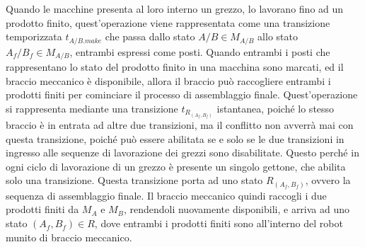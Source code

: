 \documentclass{article}
\numberwithin{equation}{subsection}
\begin{document}
Quando le macchine presenta al loro interno un grezzo, lo lavorano fino ad un prodotto finito, quest'operazione viene rappresentata come una transizione 
temporizzata $t_{A/B.make}$ che passa dallo stato $A/B\in M_{A/B}$ allo stato $A_f/B_f\in M_{A/B}$, entrambi espressi come posti. Quando entrambi i posti che rappresentano 
lo stato del prodotto finito in una macchina sono marcati, ed il braccio meccanico è disponibile, allora il braccio può raccogliere entrambi i prodotti finiti per cominciare 
il processo di assemblaggio finale. Quest'operazione si rappresenta mediante una transizione $t_{R_{(A_f,B_f)}}$ istantanea, poiché lo stesso braccio è in entrata ad altre due 
transizioni, ma il conflitto non avverrà mai con questa transizione, poiché può essere abilitata se e solo se le due transizioni in ingresso alle sequenze di lavorazione dei 
grezzi sono disabilitate. Questo perché in ogni ciclo di lavorazione di un grezzo è presente un singolo gettone, che abilita solo una transizione. 
Questa transizione porta ad uno stato $R_{(A_f,B_f)}$, ovvero la sequenza di assemblaggio finale. Il braccio meccanico quindi raccogli i due prodotti finiti da $M_A$ e $M_B$, 
rendendoli nuovamente disponibili, e arriva ad uno stato $(A_f,B_f)\in R$, dove entrambi i prodotti finiti sono all'interno del robot munito di braccio meccanico. 
\end{document}
